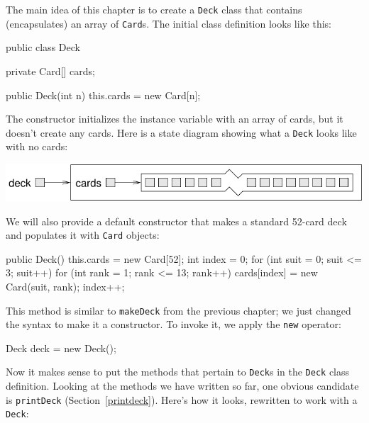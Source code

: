 \documentclass[12pt]{book}
\theoremstyle{exercise}
\newcommand{\java}[1]{\verb"#1"}
\newcommand{\java}[1]{\lstinline{#1}} %
\begin{document}
The main idea of this chapter is to create a \java{Deck} class that contains (encapsulates) an array of \java{Card}s.
The initial class definition looks like this:

\begin{code}
public class Deck {
    private Card[] cards;

    public Deck(int n) {
        this.cards = new Card[n];
    }
}
\end{code}


The constructor initializes the instance variable with an array of cards, but it doesn't create any cards.
Here is a state diagram showing what a \java{Deck} looks like with no cards:

\begin{center}
\includegraphics{figs/deckobject.pdf}
\end{center}

We will also provide a default constructor that makes a standard 52-card deck and populates it with \java{Card} objects:

\begin{code}
    public Deck() {
        this.cards = new Card[52];
        int index = 0;
        for (int suit = 0; suit <= 3; suit++) {
            for (int rank = 1; rank <= 13; rank++) {
                cards[index] = new Card(suit, rank);
                index++;
            }
        }
    }
\end{code}


This method is similar to \java{makeDeck} from the previous chapter; we just changed the syntax to make it a constructor.
To invoke it, we apply the \java{new} operator:

\begin{code}
    Deck deck = new Deck();
\end{code}


Now it makes sense to put the methods that pertain to \java{Deck}s in the \java{Deck} class definition.
Looking at the methods we have written so far, one obvious candidate is \java{printDeck} (Section~\ref{printdeck}).
Here's how it looks, rewritten to work with a \java{Deck}:
\end{document}
